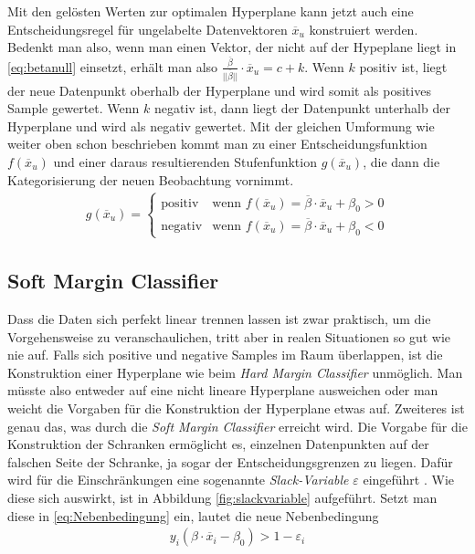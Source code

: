\documentclass[
]{article}
\begin{document}
Mit den gelösten Werten zur optimalen Hyperplane kann jetzt auch eine
Entscheidungsregel für ungelabelte Datenvektoren \(\overline{x}_u\)
konstruiert werden. Bedenkt man also, wenn man einen Vektor, der nicht
auf der Hypeplane liegt in \eqref{eq:betanull} einsetzt, erhält man also
\(\frac{\overline \beta}{||\overline{\beta}||}\cdot \overline{x}_u=c+k\).
Wenn \(k\) positiv ist, liegt der neue Datenpunkt oberhalb der
Hyperplane und wird somit als positives Sample gewertet. Wenn \(k\)
negativ ist, dann liegt der Datenpunkt unterhalb der Hyperplane und wird
als negativ gewertet. Mit der gleichen Umformung wie weiter oben schon
beschrieben kommt man zu einer Entscheidungsfunktion
\(f(\overline{x}_u)\) und einer daraus resultierenden Stufenfunktion
\(g(\overline{x}_u)\), die dann die Kategorisierung der neuen
Beobachtung vornimmt. \begin{align}
g(\overline{x}_u)=\begin{cases}\mathrm{positiv}&\text{wenn } f(\overline{x}_u)=\overline{\beta}\cdot \overline{x}_u+\beta_0 > 0\\
\mathrm{negativ} & \text{wenn }f(\overline{x}_u)=\overline{\beta}\cdot \overline{x}_u+\beta_0<0
\end{cases}\label{eq:decisionf}
\end{align}

\subsection{Soft Margin Classifier}

Dass die Daten sich perfekt linear trennen lassen ist zwar praktisch, um
die Vorgehensweise zu veranschaulichen, tritt aber in realen Situationen
so gut wie nie auf. Falls sich positive und negative Samples im Raum
überlappen, ist die Konstruktion einer Hyperplane wie beim
\textit{Hard Margin Classifier} unmöglich. Man müsste also entweder auf
eine nicht lineare Hyperplane ausweichen oder man weicht die Vorgaben
für die Konstruktion der Hyperplane etwas auf. Zweiteres ist genau das,
was durch die \textit{Soft Margin Classifier} erreicht wird. Die Vorgabe
für die Konstruktion der Schranken ermöglicht es, einzelnen Datenpunkten
auf der falschen Seite der Schranke, ja sogar der Entscheidungsgrenzen
zu liegen. Dafür wird für die Einschränkungen eine sogenannte
\textit{Slack-Variable} \(\varepsilon\) eingeführt
\parencite{jamesIntroductionStatisticalLearning2021}. Wie diese sich
auswirkt, ist in Abbildung \ref{fig:slackvariable} aufgeführt. Setzt man
diese in \eqref{eq:Nebenbedingung} ein, lautet die neue Nebenbedingung
\begin{align}
y_i(\beta \cdot \overline{x}_i-\beta_0)>1- \varepsilon_i \label{eq:nebbedsfm}
\end{align}
\end{document}
